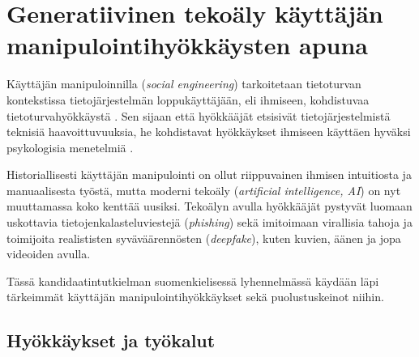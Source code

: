 


\chapter*{Generatiivinen tekoäly käyttäjän manipulointihyökkäysten apuna\label{chapter:finnish}}
\begin{comment}

Tekoälyä hyödyntävä käyttäjän manipulointi
Teokälypohjainen käyttäjän manipulointi
Tekoälyavusteinen käyttäjän manipulointi

Pyydä Riinalta ym palautetta kieliopin tarkistuksessa! Opin samalla itse. Riinahan voi tarkistaa esim tätä .tex tiedostoa GitHubista? Tai PDF kumpi vaan hänelle parempi, mutta PDF:n kassa pitää muistaa aina päivittää se Overleafiin ja sitten GitHubiin.

Ohjeet:
    - 4 or 5 sivua
    - TOC ja Chapter 1 Introduction väliin

Kappaleet:
    - (ilman nimeä sisältää Introduction ja Definition kappaleet)
    - Hyökkäykset ja työkalut
    - Puolustuskeinot
    - Puolustuskeinojen arviointia
    - Yhteenveto
    - EI Overleaf kappalenumerointia? Kappale "0"?
    

\end{comment}


Käyttäjän manipuloinnilla (\textit{social engineering}) tarkoitetaan tietoturvan kontekstissa tietojärjestelmän loppukäyttäjään, eli ihmiseen, kohdistuvaa tietoturvahyökkäystä \citep{mitnickArtDeceptionControlling2003}. Sen sijaan että hyökkääjät etsisivät tietojärjestelmistä teknisiä haavoittuvuuksia, he kohdistavat hyökkäykset ihmiseen käyttäen hyväksi psykologisia menetelmiä \citep{wangDefiningSocialEngineering2020}.

Historiallisesti käyttäjän manipulointi on ollut riippuvainen ihmisen intuitiosta ja manuaalisesta työstä, mutta moderni tekoäly (\textit{artificial intelligence, AI}) on nyt muuttamassa koko kenttää uusiksi. Tekoälyn avulla hyökkääjät pystyvät luomaan uskottavia tietojenkalasteluviestejä (\textit{phishing}) sekä imitoimaan virallisia tahoja ja toimijoita realististen syväväärennösten (\textit{deepfake}), kuten kuvien, äänen ja jopa videoiden avulla.

Tässä kandidaatintutkielman suomenkielisessä lyhennelmässä käydään läpi tärkeimmät käyttäjän manipulointihyökkäykset sekä puolustuskeinot niihin.

\section*{Hyökkäykset ja työkalut}

